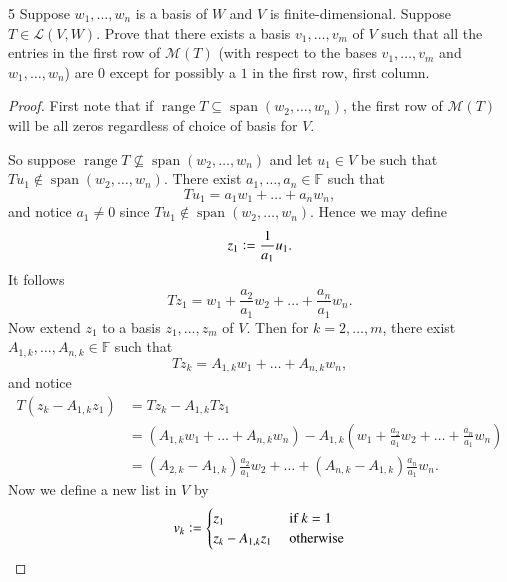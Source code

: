 \documentclass[11pt]{extarticle}
\newenvironment{problem}[1]{\begin{prob*}{#1}{}}{\end{prob*}}
\newcommand{\F}{\mathbb{F}}
\newcommand{\mat}{\mathcal{M}}
\DeclareMathOperator{\Span}{span}
\newcommand{\Hom}{\mathcal{L}}
\DeclareMathOperator{\Range}{range}
\newcommand{\defeq}{\vcentcolon=}
\begin{document}
\begin{problem}{5}
Suppose $w_1,\dots, w_n$ is a basis of $W$ and $V$ is finite-dimensional.  Suppose $T\in\Hom(V,W)$.  Prove that there exists a basis $v_1,\dots, v_m$ of $V$ such that all the entries in the first row of $\mat(T)$ (with respect to the bases $v_1,\dots,v_m$ and $w_1,\dots,w_n$) are $0$ except for possibly a $1$ in the first row, first column.
\end{problem}
\begin{proof}
First note that if $\Range T\subseteq \Span(w_2,\dots,w_n)$, the first row of $\mat(T)$ will be all zeros regardless of choice of basis for $V$.  
\par So suppose $\Range T\not\subseteq \Span(w_2,\dots, w_n)$ and let $u_1\in V$ be such that $Tu_1\not\in\Span(w_2,\dots, w_n)$.  There exist $a_1,\dots, a_n\in\F$ such that 
\begin{equation*}
Tu_1=a_1w_1+\dots + a_nw_n,
\end{equation*}
and notice $a_1\neq 0$ since $Tu_1\not\in\Span(w_2,\dots,w_n)$.  Hence we may define
\begin{equation*}
z_1 \defeq \frac{1}{a_1}u_1.
\end{equation*} 
It follows
\begin{equation}\label{eq:1}
Tz_1 = w_1 + \frac{a_2}{a_1}w_2 + \dots + \frac{a_n}{a_1}w_n.
\end{equation}
Now extend $z_1$ to a basis $z_1,\dots, z_m$ of $V$.  Then for $k=2,\dots, m$, there exist $A_{1,k},\dots, A_{n,k}\in\F$ such that 
\begin{equation*}
Tz_k = A_{1,k}w_1 + \dots + A_{n,k}w_n,
\end{equation*}
and notice
\begin{align}
T(z_k - A_{1,k}z_1) &= Tz_k - A_{1,k}Tz_1 \nonumber \\
			       &= \left(A_{1,k}w_1 + \dots + A_{n,k}w_n\right) - A_{1,k}\left( w_1 + \frac{a_2}{a_1}w_2 + \dots + \frac{a_n}{a_1}w_n\right) \nonumber\\
			       &= \left(A_{2,k} - A_{1,k}\right)\frac{a_2}{a_1}w_2 + \dots + \left(A_{n,k} - A_{1,k}\right)\frac{a_n}{a_1}w_n.  \label{eq:2}
\end{align}
Now we define a new list in $V$ by
\begin{align*}
v_k \defeq \begin{cases}z_1 &\text{ if }k = 1\\ z_k - A_{1,k}z_1 &\text{ otherwise}\end{cases}
\end{align*}

\end{proof}
\end{document}
